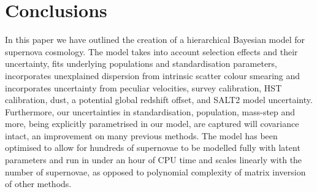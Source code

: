 \documentclass[a4paper,fleqn,usenatbib]{mnras}
\begin{document}












\section{Conclusions}

In this paper we have outlined the creation of a hierarchical Bayesian model for supernova cosmology. The model takes into account selection effects and their uncertainty, fits underlying populations and standardisation parameters, incorporates unexplained dispersion from intrinsic scatter colour smearing and incorporates uncertainty from peculiar velocities, survey calibration, HST calibration, dust, a potential global redshift offset, and SALT2 model uncertainty. Furthermore, our uncertainties in standardisation, population, mass-step and more, being explicitly parametrised in our model, are captured will covariance intact, an improvement on many previous methods. The model has been optimised to allow for hundreds of supernovae to be modelled fully with latent parameters and run in under an hour of CPU time and scales linearly with the number of supernovae, as opposed to polynomial complexity of matrix inversion of other methods.
\end{document}
